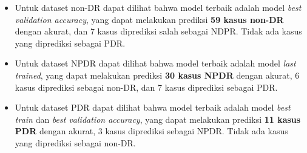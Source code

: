 \begin{itemize}
	\item Untuk dataset non-DR dapat dilihat bahwa model terbaik adalah model \emph{best validation accuracy}, yang dapat melakukan prediksi \textbf{59 kasus non-DR} dengan akurat, dan 7 kasus diprediksi salah sebagai NDPR. Tidak ada kasus yang diprediksi sebagai PDR.
	
	\item Untuk dataset NPDR dapat dilihat bahwa model terbaik adalah model \emph{last trained}, yang dapat melakukan prediksi \textbf{30 kasus NPDR} dengan akurat, 6 kasus diprediksi sebagai non-DR, dan 7 kasus diprediksi sebagai PDR.
	
	\item Untuk dataset PDR dapat dilihat bahwa model terbaik adalah model \emph{best train} dan \emph{best validation accuracy}, yang dapat melakukan prediksi \textbf{11 kasus PDR} dengan akurat, 3 kasus diprediksi sebagai NPDR. Tidak ada kasus yang diprediksi sebagai non-DR.
\end{itemize}
\pagebreak

